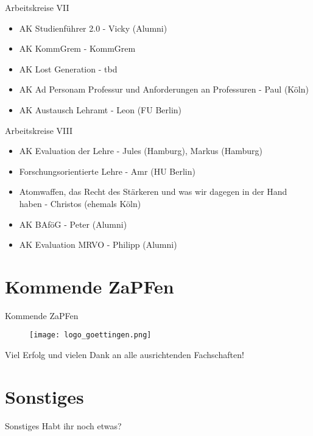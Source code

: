 \documentclass[compress, aspectratio=169]{beamer}
\begin{document}
\begin{frame}{Arbeitskreise VII}
	\begin{itemize}
		\item AK Studienführer 2.0 - Vicky (Alumni) 
		\item AK KommGrem - KommGrem 
		\item AK Lost Generation - tbd
		\item AK Ad Personam Professur und Anforderungen an Professuren - Paul (Köln)
		\item AK Austausch Lehramt - Leon (FU Berlin)
	\end{itemize}
\end{frame}

\begin{frame}{Arbeitskreise VIII}
	\begin{itemize}
		\item AK Evaluation der Lehre - Jules (Hamburg), Markus (Hamburg)
		\item Forschungsorientierte Lehre - Amr (HU Berlin)
		\item Atomwaffen, das Recht des Stärkeren und was wir dagegen in der Hand haben - Christos (ehemals Köln)
		\item AK BAföG - Peter (Alumni)
		\item AK Evaluation MRVO - Philipp (Alumni)
	\end{itemize}
\end{frame}

\section{Kommende ZaPFen}

\begin{frame}{Kommende ZaPFen}
    \begin{figure}
        \centering
        \texttt{[image: logo\_goettingen.png]}
    \end{figure}
    \vspace{0.25cm}
    \centering
    \large Viel Erfolg und vielen Dank an alle ausrichtenden Fachschaften!
\end{frame}

\section{Sonstiges}

\begin{frame}{Sonstiges}
\centering
\huge Habt ihr noch etwas?

\end{frame}
\end{document}

